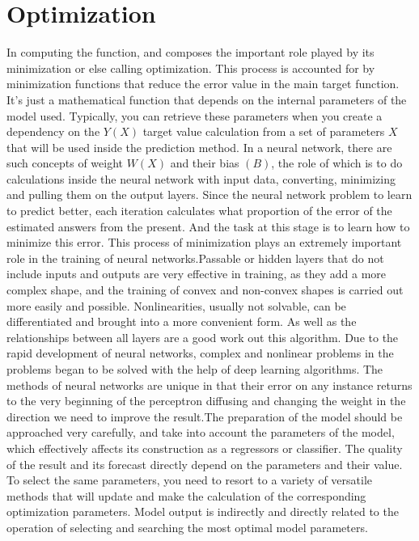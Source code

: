 \section{Optimization}\label{sec:3.6}
\par In computing the function, and composes the important role played by its minimization or else calling optimization. This process is accounted for by minimization functions that reduce the error value in the main target function. It's just a mathematical function that depends on the internal parameters of the model used. Typically, you can retrieve these parameters when you create a dependency on the $Y(X)$ target value calculation from a set of parameters $X$ that will be used inside the prediction method. In a neural network, there are such concepts of weight $W(X)$ and their bias $(B)$, the role of which is to do calculations inside the neural network with input data, converting, minimizing and pulling them on the output layers. Since the neural network problem to learn to predict better, each iteration calculates what proportion of the error of the estimated answers from the present. And the task at this stage is to learn how to minimize this error. This process of minimization plays an extremely important role in the training of neural networks.Passable or hidden layers that do not include inputs and outputs are very effective in training, as they add a more complex shape, and the training of convex and non-convex shapes is carried out more easily and possible. Nonlinearities, usually not solvable, can be differentiated and brought into a more convenient form. As well as the relationships between all layers are a good work out this algorithm. Due to the rapid development of neural networks, complex and nonlinear problems in the problems began to be solved with the help of deep learning algorithms. The methods of neural networks are unique in that their error on any instance returns to the very beginning of the perceptron diffusing and changing the weight in the direction we need to improve the result.The preparation of the model should be approached very carefully, and take into account the parameters of the model, which effectively affects its construction as a regressors or classifier. The quality of the result and its forecast directly depend on the parameters and their value. To select the same parameters, you need to resort to a variety of versatile methods that will update and make the calculation of the corresponding optimization parameters. Model output is indirectly and directly related to the operation of selecting and searching the most optimal model parameters.
